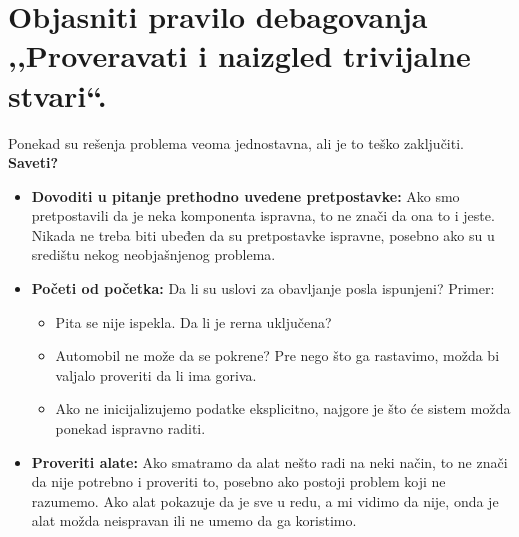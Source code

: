 \documentclass[a4paper]{article}
\begin{document}
\section{Objasniti pravilo debagovanja ,,Proveravati i naizgled trivijalne stvari``.}
  \noindent Ponekad su rešenja problema veoma jednostavna, ali je to teško zaključiti. \\
  \textbf{Saveti?}
  \begin{itemize}
    \item \textbf{Dovoditi u pitanje prethodno uvedene pretpostavke:} Ako smo pretpostavili
          da je neka komponenta ispravna, to ne znači da ona to i jeste. Nikada ne treba
          biti ubeđen da su pretpostavke ispravne, posebno ako su u središtu nekog neobjašnjenog
          problema.
    \item \textbf{Početi od početka:} Da li su uslovi za obavljanje posla ispunjeni? Primer:
          \begin{itemize}
            \item Pita se nije ispekla. Da li je rerna uključena?
            \item Automobil ne može da se pokrene? Pre nego što ga rastavimo, možda bi valjalo
                  proveriti da li ima goriva.
            \item Ako ne inicijalizujemo podatke eksplicitno, najgore je što će sistem možda
                  ponekad ispravno raditi.
          \end{itemize}
    \item \textbf{Proveriti alate:} Ako smatramo da alat nešto radi na neki način, to ne znači
          da nije potrebno i proveriti to, posebno ako postoji problem koji ne razumemo. Ako
          alat pokazuje da je sve u redu, a mi vidimo da nije, onda je alat možda neispravan ili
          ne umemo da ga koristimo.
  \end{itemize}
\end{document}
